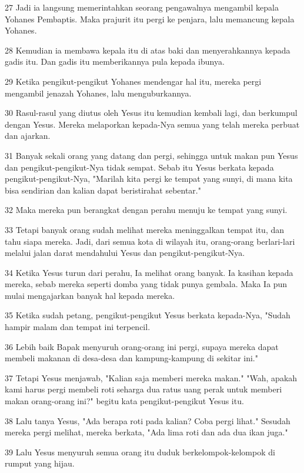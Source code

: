 \par 27 Jadi ia langsung memerintahkan seorang pengawalnya mengambil kepala Yohanes Pembaptis. Maka prajurit itu pergi ke penjara, lalu memancung kepala Yohanes.
\par 28 Kemudian ia membawa kepala itu di atas baki dan menyerahkannya kepada gadis itu. Dan gadis itu memberikannya pula kepada ibunya.
\par 29 Ketika pengikut-pengikut Yohanes mendengar hal itu, mereka pergi mengambil jenazah Yohanes, lalu menguburkannya.
\par 30 Rasul-rasul yang diutus oleh Yesus itu kemudian kembali lagi, dan berkumpul dengan Yesus. Mereka melaporkan kepada-Nya semua yang telah mereka perbuat dan ajarkan.
\par 31 Banyak sekali orang yang datang dan pergi, sehingga untuk makan pun Yesus dan pengikut-pengikut-Nya tidak sempat. Sebab itu Yesus berkata kepada pengikut-pengikut-Nya, "Marilah kita pergi ke tempat yang sunyi, di mana kita bisa sendirian dan kalian dapat beristirahat sebentar."
\par 32 Maka mereka pun berangkat dengan perahu menuju ke tempat yang sunyi.
\par 33 Tetapi banyak orang sudah melihat mereka meninggalkan tempat itu, dan tahu siapa mereka. Jadi, dari semua kota di wilayah itu, orang-orang berlari-lari melalui jalan darat mendahului Yesus dan pengikut-pengikut-Nya.
\par 34 Ketika Yesus turun dari perahu, Ia melihat orang banyak. Ia kasihan kepada mereka, sebab mereka seperti domba yang tidak punya gembala. Maka Ia pun mulai mengajarkan banyak hal kepada mereka.
\par 35 Ketika sudah petang, pengikut-pengikut Yesus berkata kepada-Nya, "Sudah hampir malam dan tempat ini terpencil.
\par 36 Lebih baik Bapak menyuruh orang-orang ini pergi, supaya mereka dapat membeli makanan di desa-desa dan kampung-kampung di sekitar ini."
\par 37 Tetapi Yesus menjawab, "Kalian saja memberi mereka makan." "Wah, apakah kami harus pergi membeli roti seharga dua ratus uang perak untuk memberi makan orang-orang ini?" begitu kata pengikut-pengikut Yesus itu.
\par 38 Lalu tanya Yesus, "Ada berapa roti pada kalian? Coba pergi lihat." Sesudah mereka pergi melihat, mereka berkata, "Ada lima roti dan ada dua ikan juga."
\par 39 Lalu Yesus menyuruh semua orang itu duduk berkelompok-kelompok di rumput yang hijau.

